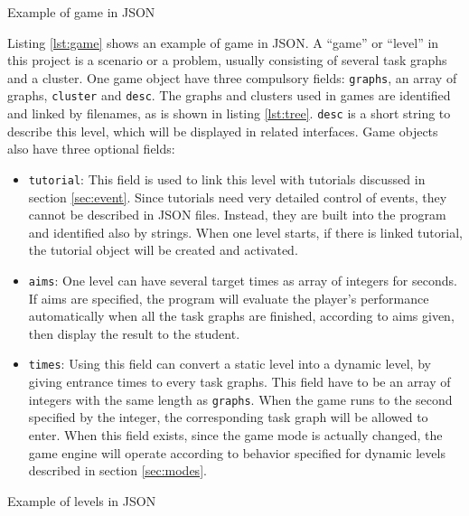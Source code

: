 \documentclass[msc,deptreport, cs]{infthesis}
\begin{document}
\vspace{0.5em}
\begin{lstfloat}
  
  \caption{Example of game in JSON}
  \label{lst:game}
  \vspace{-1em}
\end{lstfloat}
\vspace{-0.5em}

Listing \ref{lst:game} shows an example of game in JSON. A ``game'' or ``level'' in this project is a scenario or a problem, usually consisting of several task graphs and a cluster. One game object have three compulsory fields: \verb+graphs+, an array of graphs, \verb+cluster+ and \verb+desc+. The graphs and clusters used in games are identified and linked by filenames, as is shown in listing \ref{lst:tree}. \verb+desc+ is a short string to describe this level, which will be displayed in related interfaces. Game objects also have three optional fields:
\begin{itemize}
  \item \verb+tutorial+: This field is used to link this level with tutorials discussed in section \ref{sec:event}. Since tutorials need very detailed control of events, they cannot be described in JSON files. Instead, they are built into the program and identified also by strings. When one level starts, if there is linked tutorial, the tutorial object will be created and activated.
  \item \verb+aims+: One level can have several target times as array of integers for seconds. If aims are specified, the program will evaluate the player's performance automatically when all the task graphs are finished, according to aims given, then display the result to the student.
  \item \verb+times+: Using this field can convert a static level into a dynamic level, by giving entrance times to every task graphs. This field have to be an array of integers with the same length as \verb+graphs+. When the game runs to the second specified by the integer, the corresponding task graph will be allowed to enter. When this field exists, since the game mode is actually changed, the game engine will operate according to behavior specified for dynamic levels described in section \ref{sec:modes}.
\end{itemize}

\vspace{0.5em}
\begin{lstfloat}
  
  \caption{Example of levels in JSON}
  \label{lst:levels}
  \vspace{-1em}
\end{lstfloat}
\vspace{-0.5em}
\end{document}
